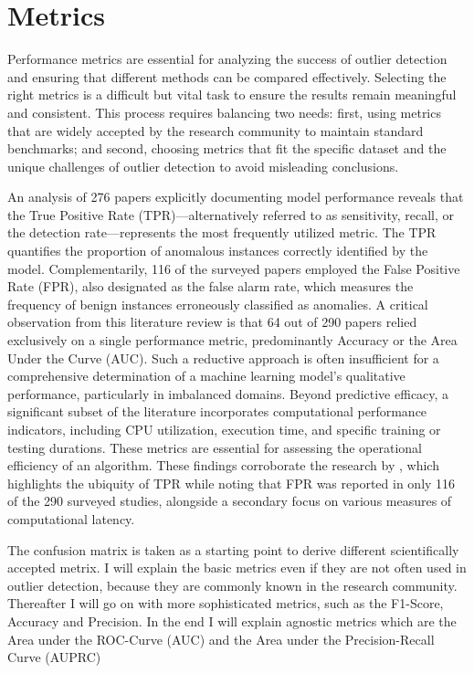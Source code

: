 \section{Metrics}
Performance metrics are essential for analyzing the success of outlier detection and ensuring that different methods can be compared effectively. 
Selecting the right metrics is a difficult but vital task to ensure the results remain meaningful and consistent. 
This process requires balancing two needs: first, using metrics that are widely accepted by the research community to maintain standard benchmarks; and second, choosing metrics that fit the specific dataset and the unique challenges of outlier detection to avoid misleading conclusions.


An analysis of 276 papers explicitly documenting model performance reveals that the True Positive Rate (TPR)—alternatively referred to as sensitivity, recall, or the detection rate—represents the most frequently utilized metric. 
The TPR quantifies the proportion of anomalous instances correctly identified by the model. 
Complementarily, 116 of the surveyed papers employed the False Positive Rate (FPR), also designated as the false alarm rate, which measures the frequency of benign instances erroneously classified as anomalies.
A critical observation from this literature review is that 64 out of 290 papers relied exclusively on a single performance metric, predominantly Accuracy or the Area Under the Curve (AUC). 
Such a reductive approach is often insufficient for a comprehensive determination of a machine learning model's qualitative performance, particularly in imbalanced domains. 
Beyond predictive efficacy, a significant subset of the literature incorporates computational performance indicators, including CPU utilization, execution time, and specific training or testing durations. 
These metrics are essential for assessing the operational efficiency of an algorithm. 
These findings corroborate the research by \citep[postfix]{nassif2021}, which highlights the ubiquity of TPR while noting that FPR was reported in only 116 of the 290 surveyed studies, alongside a secondary focus on various measures of computational latency.


The confusion matrix is taken as a starting point to derive different scientifically accepted metrix.
I will explain the basic metrics even if they are not often used in outlier detection, because they are commonly known in the research community. 
Thereafter I will go on with more sophisticated metrics, such as the F1-Score, Accuracy and Precision.
In the end I will explain agnostic metrics which are the Area under the ROC-Curve (AUC) and the Area under the Precision-Recall Curve (AUPRC)


